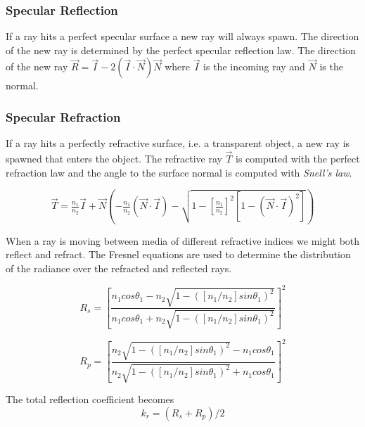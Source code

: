 \documentclass[a4paper, twocolumn]{article}
\begin{document}
            \subsubsection{Specular Reflection} \label{sec:specular_reflection}
            If a ray hits a perfect specular surface a new ray will always spawn. The direction of the new ray is determined by the perfect specular reflection law. The direction of the new ray $\vec{R} = \vec{I} - 2 (\vec{I} \cdot \vec{N}) \vec{N}$ where $\vec{I}$ is the incoming ray and $\vec{N}$ is the normal.

            \subsubsection{Specular Refraction} \label{sec:specular_refraction}
            If a ray hits a perfectly refractive surface, i.e. a transparent object, a new ray is spawned that enters the object.
            The refractive ray $\vec{T}$ is computed with the perfect refraction law and the angle to the surface normal is computed with \emph{Snell's law}.

            \small
            \begin{equation*}
              \vec{T} = \tfrac{n_1}{n_2}\vec{I} + \vec{N}\left(-\tfrac{n_1}{n_2}(\vec{N}\cdot\vec{I}) - \sqrt{1 - [\tfrac{n_1}{n_2}]^2[1 - (\vec{N}\cdot\vec{I})^2]}\right)
            \end{equation*}
            \normalsize

            When a ray is moving between media of different refractive indices we might both reflect and refract. The Fresnel equations are used to determine the distribution of the radiance over the refracted and reflected rays.

            \begin{equation*}
            R_s = \left[\frac{n_1cos\theta_1 - n_2\sqrt{1-([n_1/n_2]sin\theta_1)^2}}{n_1cos\theta_1 + n_2\sqrt{1-([n_1/n_2]sin\theta_1)^2}}\right]^2
          \end{equation*}

          \begin{equation*}
            R_p = \left[\frac{n_2\sqrt{1-([n_1/n_2]sin\theta_1)^2} - n_1cos\theta_1}{n_2\sqrt{1-([n_1/n_2]sin\theta_1)^2} + n_1cos\theta_1}\right]^2
          \end{equation*}

          The total reflection coefficient becomes
          \begin{equation*}
            k_r = (R_s + R_p)/2
          \end{equation*}
\end{document}
